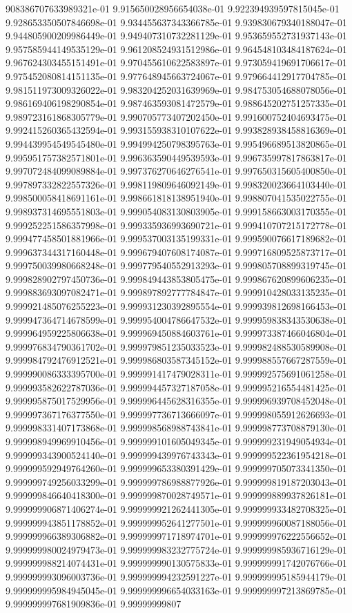 908386707633989321e-01	9.915650028956654038e-01	9.922394939597815045e-01	9.928653350507846698e-01	9.934455637343366785e-01	9.939830679340188047e-01	9.944805900209986449e-01	9.949407310732281129e-01	9.953659552731937143e-01	9.957585944149535129e-01	9.961208524931512986e-01	9.964548103484187624e-01	9.967624303455151491e-01	9.970455610622583897e-01	9.973059419691706617e-01	9.975452080814151135e-01	9.977648945663724067e-01	9.979664412917704785e-01	9.981511973009326022e-01	9.983204252031639969e-01	9.984753054688078056e-01	9.986169406198290854e-01	9.987463593081472579e-01	9.988645202751257335e-01	9.989723161868305779e-01	9.990705773407202450e-01	9.991600752404693475e-01	9.992415260365432594e-01	9.993155938310107622e-01	9.993828938458816369e-01	9.994439954549545480e-01	9.994994250798395763e-01	9.995496689513820865e-01	9.995951757382571801e-01	9.996363590449539593e-01	9.996735997817863817e-01	9.997072484099089884e-01	9.997376270646276541e-01	9.997650315605400850e-01	9.997897332822557326e-01	9.998119809646092149e-01	9.998320023664103440e-01	9.998500058418691161e-01	9.998661818138951940e-01	9.998807041535022755e-01	9.998937314695551803e-01	9.999054083130803905e-01	9.999158663003170355e-01	9.999252251586357998e-01	9.999335936993690721e-01	9.999410707215172778e-01	9.999477458501881966e-01	9.999537003135199331e-01	9.999590076617189682e-01	9.999637344317160448e-01	9.999679407608174087e-01	9.999716809525873717e-01	9.999750039980668248e-01	9.999779540552913293e-01	9.999805708899319745e-01	9.999828902797450736e-01	9.999849443853805475e-01	9.999867620899606235e-01	9.999883693097082471e-01	9.999897892777784847e-01	9.999910428033135235e-01	9.999921485076255223e-01	9.999931230392895554e-01	9.999939812698166453e-01	9.999947364714678599e-01	9.999954004786647532e-01	9.999959838343530638e-01	9.999964959225806638e-01	9.999969450884603761e-01	9.999973387466046804e-01	9.999976834790361702e-01	9.999979851235033523e-01	9.999982488530589908e-01	9.999984792476912521e-01	9.999986803587345152e-01	9.999988557667287559e-01	9.999990086333395700e-01	9.999991417479028311e-01	9.999992575691061258e-01	9.999993582622787036e-01	9.999994457327187058e-01	9.999995216554481425e-01	9.999995875017529956e-01	9.999996445628316355e-01	9.999996939708452048e-01	9.999997367176377550e-01	9.999997736713666097e-01	9.999998055912626693e-01	9.999998331407173868e-01	9.999998568988743841e-01	9.999998773708879130e-01	9.999998949969910456e-01	9.999999101605049345e-01	9.999999231949054934e-01	9.999999343900524140e-01	9.999999439976743343e-01	9.999999522361954218e-01	9.999999592949764260e-01	9.999999653380391429e-01	9.999999705073341350e-01	9.999999749256033299e-01	9.999999786988877926e-01	9.999999819187203043e-01	9.999999846640418300e-01	9.999999870028749571e-01	9.999999889937826181e-01	9.999999906871406274e-01	9.999999921262441305e-01	9.999999933482708325e-01	9.999999943851178852e-01	9.999999952641277501e-01	9.999999960087188056e-01	9.999999966389306882e-01	9.999999971718974701e-01	9.999999976222556652e-01	9.999999980024979473e-01	9.999999983232775724e-01	9.999999985936716129e-01	9.999999988214074431e-01	9.999999990130575833e-01	9.999999991742076766e-01	9.999999993096003736e-01	9.999999994232591227e-01	9.999999995185944179e-01	9.999999995984945045e-01	9.999999996654033163e-01	9.999999997213869785e-01	9.999999997681909836e-01	9.99999999807